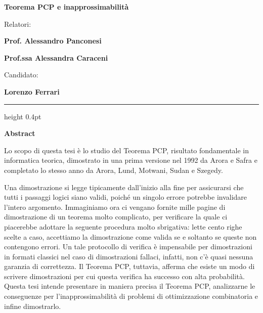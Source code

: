 \documentclass[11pt]{article}
\begin{document}
\pagestyle{empty}

\begin{center}
  {\Large\bfseries Teorema PCP e inapprossimabilità \par}
\end{center}

\vspace{0.8em}

\noindent
\begin{minipage}[t]{0.47\textwidth}
  {\large Relatori: \par}
  \vspace{0.2em}
  {\bfseries\large Prof. Alessandro Panconesi \par}
  {\bfseries\large Prof.ssa Alessandra Caraceni \par}
\end{minipage}%
\hfill
\begin{minipage}[t]{0.47\textwidth}\raggedleft
  {\large Candidato: \par}
  \vspace{0.2em}
  {\bfseries\large Lorenzo Ferrari \par}
\end{minipage}

\vspace{0.8em}
\hrule height 0.4pt
\vspace{0.8em}

\begin{center}
  {\large\bfseries Abstract \par}
\end{center}
\vspace{0.2em}

Lo scopo di questa tesi è lo studio del Teorema PCP, risultato fondamentale
in informatica teorica, dimostrato in una prima versione nel 1992 da Arora e
Safra e completato lo stesso anno da Arora, Lund, Motwani, Sudan e Szegedy.

Una dimostrazione si legge tipicamente dall'inizio alla fine per assicurarsi
che tutti i passaggi logici siano validi, poiché un singolo errore potrebbe
invalidare l'intero argomento.
Immaginiamo ora ci vengano fornite mille pagine di dimostrazione di un teorema
molto complicato, per verificare la quale ci piacerebbe adottare la seguente
procedura molto sbrigativa: lette cento righe scelte a caso, accettiamo la
dimostrazione come valida se e soltanto se queste non contengono errori.
Un tale protocollo di verifica è impensabile per dimostrazioni in
formati classici nel caso di dimostrazioni fallaci, infatti, non c'è quasi nessuna
garanzia di correttezza.
Il Teorema PCP, tuttavia, afferma che esiste un modo di scrivere dimostrazioni
per cui questa verifica ha successo con alta probabilità.
Questa tesi intende presentare in maniera precisa il Teorema PCP, analizzarne le
conseguenze per l'inapprossimabilità di problemi di ottimizzazione combinatoria
e infine dimostrarlo.
\end{document}
